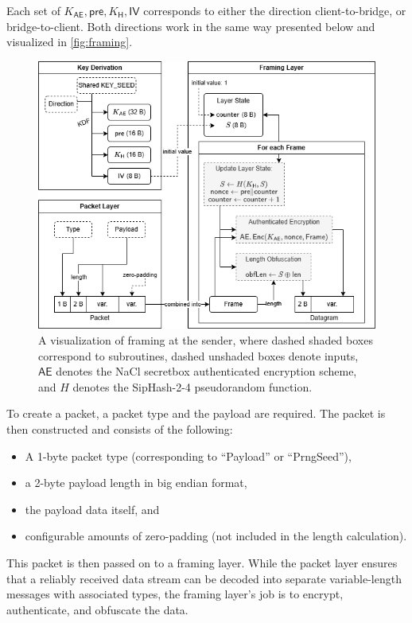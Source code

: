 Each set of $K_\mathsf{AE}, \mathsf{pre}, K_\mathsf{H}, \mathsf{IV}$ corresponds to either the direction client-to-bridge, or bridge-to-client. Both directions work in the same way presented below and visualized in \cref{fig:framing}.

\begin{figure}
    \centering
    \includegraphics[width=\linewidth]{images/packet-framing.png}
    \caption[
        A visualization of \obfsfour{} framing at the sender.
    ]{
        A visualization of \obfsfour{} framing at the sender, where dashed shaded boxes correspond to subroutines, dashed unshaded boxes denote inputs, $\mathsf{AE}$ denotes the NaCl secretbox authenticated encryption scheme, and $H$ denotes the SipHash-2-4 pseudorandom function. 
    }
    \label{fig:enter-label}
\end{figure}

To create a packet, a packet type and the payload are required. The packet is then constructed and consists of the following:
\begin{itemize}
    \item A 1-byte packet type (corresponding to ``Payload'' or ``PrngSeed''),
    \item a 2-byte payload length in big endian format,
    \item the payload data itself, and
    \item configurable amounts of zero-padding (not included in the length calculation).
\end{itemize}

This packet is then passed on to a framing layer. While the packet layer ensures that a reliably received data stream can be decoded into separate variable-length messages with associated types, the framing layer's job is to encrypt, authenticate, and obfuscate the data.

